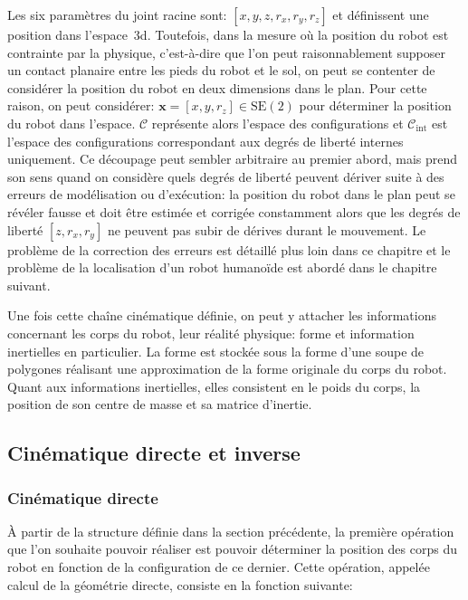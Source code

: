 Les six paramètres du joint racine sont: $[x, y, z, r_x, r_y, r_z]$ et
définissent une position dans l'espace 3d. Toutefois, dans la mesure
où la position du robot est contrainte par la physique, c'est-à-dire
que l'on peut raisonnablement supposer un contact planaire entre les
pieds du robot et le sol, on peut se contenter de considérer la
position du robot en deux dimensions dans le plan. Pour cette raison,
on peut considérer: $\mathbf{x} = [x, y, r_z] \in \text{SE}(2)$ pour
déterminer la position du robot dans l'espace. $\mathcal{C}$
représente alors l'espace des configurations et
$\mathcal{C}_{\text{int}}$ est l'espace des configurations
correspondant aux degrés de liberté internes uniquement. Ce découpage
peut sembler arbitraire au premier abord, mais prend son sens quand on
considère quels degrés de liberté peuvent dériver suite à des erreurs
de modélisation ou d'exécution: la position du robot dans le plan peut
se révéler fausse et doit être estimée et corrigée constamment alors
que les degrés de liberté $[z, r_x, r_y]$ ne peuvent pas subir de
dérives durant le mouvement. Le problème de la correction des erreurs
est détaillé plus loin dans ce chapitre et le problème de la
localisation d'un robot humanoïde est abordé dans le chapitre
suivant.


Une fois cette chaîne cinématique définie, on peut y attacher les
informations concernant les corps du robot, leur réalité physique:
forme et information inertielles en particulier. La forme est stockée
sous la forme d'une soupe de polygones réalisant une approximation de
la forme originale du corps du robot. Quant aux informations
inertielles, elles consistent en le poids du corps, la position de son
centre de masse et sa matrice d'inertie.


\subsection{Cinématique directe et inverse}

\subsubsection{Cinématique directe}

À partir de la structure définie dans la section précédente, la
première opération que l'on souhaite pouvoir réaliser est pouvoir
déterminer la position des corps du robot en fonction de la
configuration de ce dernier. Cette opération, appelée calcul de la
géométrie directe, consiste en la fonction suivante:

